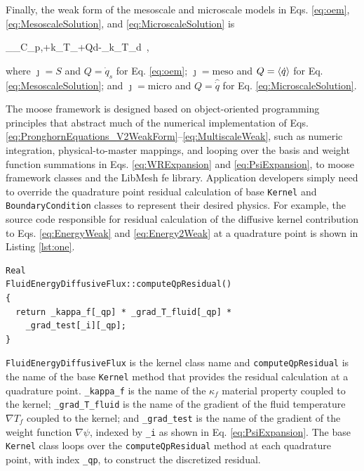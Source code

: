 Finally, the weak form of the mesoscale and microscale models in Eqs. \eqref{eq:oem}, \eqref{eq:MesoscaleSolution}, and \eqref{eq:MicroscaleSolution} is

\beq
\label{eq:MultiscaleWeak}
\int_\Omega\left\lbrack\rho_\jmath C_{p,\jmath}\psi+k_\jmath\nabla T_\jmath\cdot\nabla\psi+Q\psi\right\rbrack d\Omega-\int_\Gamma k_\jmath\nabla T_\jmath\cdot{}\psi d\ ,
\eeq

\noindent where \(\jmath=S\) and \(Q=\dot{q}_s\) for Eq. \eqref{eq:oem}; \(\jmath=\text{meso}\) and \(Q=\langle\dot{q}\rangle\) for Eq. \eqref{eq:MesoscaleSolution}; and \(\jmath=\text{micro}\) and \(Q=\hat{\dot{q}}\) for Eq. \eqref{eq:MicroscaleSolution}.

The \gls{moose} framework is designed based on object-oriented programming principles that abstract much of the numerical implementation of Eqs. \eqref{eq:PronghornEquations_V2WeakForm}--\eqref{eq:MultiscaleWeak}, such as numeric integration, physical-to-master mappings, and looping over the basis and weight function summations in Eqs. \eqref{eq:WRExpansion} and \eqref{eq:PsiExpansion}, to \gls{moose} framework classes and the LibMesh \gls{fe} library. Application developers simply need to override the quadrature point residual calculation of base \texttt{Kernel} and \texttt{BoundaryCondition} classes to represent their desired physics. For example, the source code responsible for residual calculation of the diffusive kernel contribution to Eqs. \eqref{eq:EnergyWeak} and \eqref{eq:Energy2Weak} at a quadrature point is shown in Listing \ref{lst:one}.

\vspace{1em}
\begin{minipage}[c]{0.92\linewidth}
\begin{lstlisting}[caption={Pronghorn source code calculation of \(\int_\Omega\kappa_f\nabla T_f\cdot\nabla\psi d\Omega\).},captionpos=b,label={lst:one}]
Real
FluidEnergyDiffusiveFlux::computeQpResidual()
{
  return _kappa_f[_qp] * _grad_T_fluid[_qp] *
    _grad_test[_i][_qp];
}
\end{lstlisting}
\end{minipage}

\texttt{FluidEnergyDiffusiveFlux} is the kernel class name and \texttt{computeQpResidual} is the name of the base \texttt{Kernel} method that provides the residual calculation at a quadrature point. \texttt{\_kappa\_f} is the name of the \(\kappa_f\) material property coupled to the kernel; \texttt{\_grad\_T\_fluid} is the name of the gradient of the fluid temperature \(\nabla T_f\) coupled to the kernel; and \texttt{\_grad\_test} is the name of the gradient of the weight function \(\nabla\psi\), indexed by \texttt{\_i} as shown in Eq. \eqref{eq:PsiExpansion}. The base \texttt{Kernel} class loops over the \texttt{computeQpResidual} method at each quadrature point, with index \texttt{\_qp}, to construct the discretized residual.

